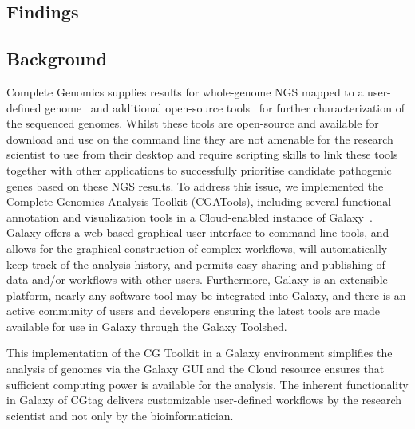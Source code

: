 \documentclass[10pt]{bmc_article}
\newenvironment{bmcformat}{\begin{raggedright}\baselineskip20pt\sloppy\setboolean{publ}{false}}{\end{raggedright}\baselineskip20pt\sloppy}
\begin{document}
\begin{bmcformat}
\section*{Findings }
\subsection*{Background}
Complete Genomics supplies results for whole-genome NGS mapped to a user-defined genome~\cite{ma} and additional open-source tools~\cite{url-cgatools} for further characterization of the sequenced genomes.  Whilst these tools are open-source and available for download and use on the command line they are not amenable for the research scientist to use from their desktop and require scripting skills to link these tools together with other applications to successfully prioritise candidate pathogenic genes based on these NGS results.  To address this issue, we implemented the Complete Genomics Analysis Toolkit (CGATools), including several functional annotation and visualization tools in a Cloud-enabled instance of Galaxy~\cite{drmanac}.  Galaxy offers a web-based graphical user interface to command line tools, and allows for the graphical construction of complex workflows, will automatically keep track of the analysis history, and permits easy sharing and publishing of data and/or workflows with other users. Furthermore, Galaxy is an extensible platform, nearly any software tool may be integrated into Galaxy, and there is an active community of users and developers ensuring the latest tools are made available for use in Galaxy through the Galaxy Toolshed.

This implementation of the CG Toolkit in a Galaxy environment simplifies the analysis of genomes via the Galaxy GUI and the Cloud resource ensures that sufficient computing power is available for the analysis.  The inherent functionality in Galaxy of CGtag delivers customizable user-defined workflows by the research scientist and not only by the bioinformatician.   


\end{bmcformat}
\end{document}
